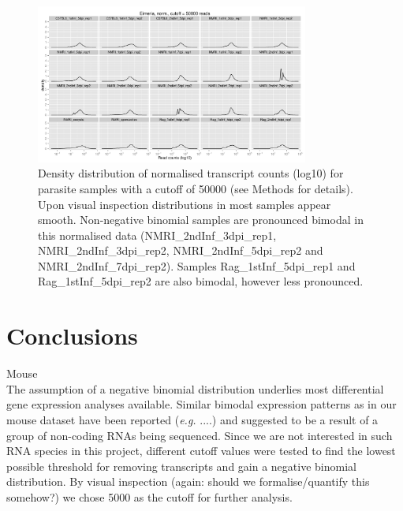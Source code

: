 \documentclass{article}
\begin{document}
\begin{figure}[h]
\begin{center}
\includegraphics[width=0.8\textwidth]{distributions_Efnorm50000} %
\caption{Density distribution of normalised transcript counts (log10)
  for parasite samples with a cutoff of 50000 (see Methods for
  details). Upon visual inspection distributions in most samples
  appear smooth. Non-negative binomial samples are pronounced bimodal
  in this normalised data (NMRI\_2ndInf\_3dpi\_rep1,
  NMRI\_2ndInf\_3dpi\_rep2, NMRI\_2ndInf\_5dpi\_rep2 and
  NMRI\_2ndInf\_7dpi\_rep2). Samples Rag\_1stInf\_5dpi\_rep1 and
  Rag\_1stInf\_5dpi\_rep2 are also bimodal, however less pronounced.}
\end{center}
\end{figure}



\section{Conclusions}

Mouse\\
The assumption of a negative binomial distribution underlies most
differential gene expression analyses available. Similar bimodal
expression patterns as in our mouse dataset have been reported
(\textit{e.g.} ....) and suggested to be a result of a group of
non-coding RNAs being sequenced. Since we are not interested in such
RNA species in this project, different cutoff values were tested to
find the lowest possible threshold for removing transcripts and gain a
negative binomial distribution. By visual inspection (again: should we
formalise/quantify this somehow?) we chose 5000 as the cutoff for
further analysis.\\
\end{document}
